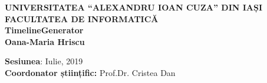 \begin{titlepage}
   \begin{center}
	   \Large
       \textbf{UNIVERSITATEA “ALEXANDRU IOAN CUZA” DIN IAȘI}\\
 	   \textbf{FACULTATEA DE INFORMATICĂ}\\


       \vspace{3cm}
	   \Huge
       \textbf{TimelineGenerator}\\

	 \vspace{1cm}
	   \normalsize
 	   \textbf{Oana-Maria Hriscu}
       \vfill 
       \vspace{0.8cm}
 
 \Large
       \textbf{Sesiunea}: Iulie, 2019\\
       \textbf{Coordonator științific:} Prof.Dr. Cristea Dan
      
 
   \end{center}
\end{titlepage}
